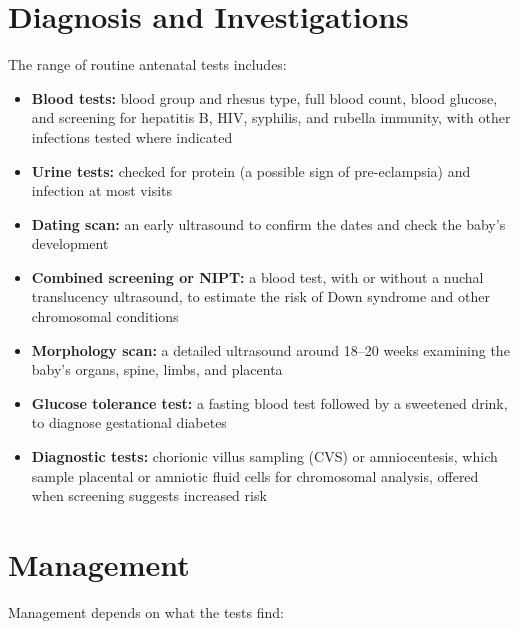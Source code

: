 \section*{Diagnosis and Investigations}
The range of routine antenatal tests includes:

\begin{itemize}
    \item \textbf{Blood tests:} blood group and rhesus type, full blood count, blood glucose, and screening for hepatitis B, HIV, syphilis, and rubella immunity, with other infections tested where indicated
    \item \textbf{Urine tests:} checked for protein (a possible sign of pre-eclampsia) and infection at most visits
    \item \textbf{Dating scan:} an early ultrasound to confirm the dates and check the baby's development
    \item \textbf{Combined screening or NIPT:} a blood test, with or without a nuchal translucency ultrasound, to estimate the risk of Down syndrome and other chromosomal conditions
    \item \textbf{Morphology scan:} a detailed ultrasound around 18--20 weeks examining the baby's organs, spine, limbs, and placenta
    \item \textbf{Glucose tolerance test:} a fasting blood test followed by a sweetened drink, to diagnose gestational diabetes
    \item \textbf{Diagnostic tests:} chorionic villus sampling (CVS) or amniocentesis, which sample placental or amniotic fluid cells for chromosomal analysis, offered when screening suggests increased risk
\end{itemize}

\section*{Management}
Management depends on what the tests find:

